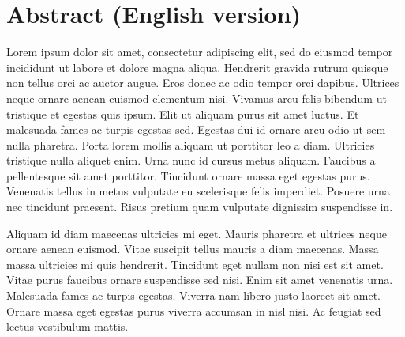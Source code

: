 


\chapter*{Abstract (English version)}

Lorem ipsum dolor sit amet, consectetur adipiscing elit, sed do eiusmod tempor incididunt ut labore et dolore magna aliqua. Hendrerit gravida rutrum quisque non tellus orci ac auctor augue. Eros donec ac odio tempor orci dapibus. Ultrices neque ornare aenean euismod elementum nisi. Vivamus arcu felis bibendum ut tristique et egestas quis ipsum. Elit ut aliquam purus sit amet luctus. Et malesuada fames ac turpis egestas sed. Egestas dui id ornare arcu odio ut sem nulla pharetra. Porta lorem mollis aliquam ut porttitor leo a diam. Ultricies tristique nulla aliquet enim. Urna nunc id cursus metus aliquam. Faucibus a pellentesque sit amet porttitor. Tincidunt ornare massa eget egestas purus. Venenatis tellus in metus vulputate eu scelerisque felis imperdiet. Posuere urna nec tincidunt praesent. Risus pretium quam vulputate dignissim suspendisse in.

Aliquam id diam maecenas ultricies mi eget. Mauris pharetra et ultrices neque ornare aenean euismod. Vitae suscipit tellus mauris a diam maecenas. Massa massa ultricies mi quis hendrerit. Tincidunt eget nullam non nisi est sit amet. Vitae purus faucibus ornare suspendisse sed nisi. Enim sit amet venenatis urna. Malesuada fames ac turpis egestas. Viverra nam libero justo laoreet sit amet. Ornare massa eget egestas purus viverra accumsan in nisl nisi. Ac feugiat sed lectus vestibulum mattis.